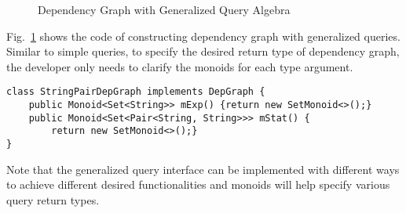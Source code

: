 \begin{figure}[tb]
\vspace{-.1in}
\caption{Dependency Graph with Generalized Query Algebra}
\label{deps2}
\end{figure}

Fig.~\ref{deps2} shows the code of constructing dependency graph with generalized queries. Similar to simple queries, to specify the desired return type of dependency graph, the developer only needs to clarify the monoids for each type argument. 

\begin{lstlisting}[numbers=none]
class StringPairDepGraph implements DepGraph {
	public Monoid<Set<String>> mExp() {return new SetMonoid<>();}
	public Monoid<Set<Pair<String, String>>> mStat() {
		return new SetMonoid<>();}
}
\end{lstlisting}

Note that the generalized query interface can be implemented with different ways to achieve different desired functionalities and monoids will help specify various query return types. 